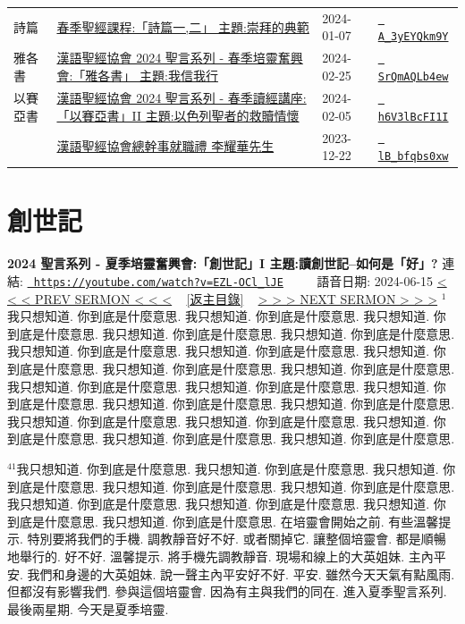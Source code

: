 \documentclass{book}
\begin{document}
{\begin{xltabular}{\textwidth}{|p{0.15\textwidth} p{0.6\textwidth}|p{0.07\textwidth} p{0.1\textwidth}|}
詩篇   & \hyperref[sec:A_3yEYQkm9Y]{春季聖經課程:「詩篇一,二」 主題:崇拜的典範} & 2024-01-07 & \href{https://youtube.com/watch?v=A_3yEYQkm9Y}{\texttt{ A\_3yEYQkm9Y}} \\
雅各書   & \hyperref[sec:SrQmAQLb4ew]{漢語聖經協會 2024 聖言系列 - 春季培靈奮興會:「雅各書」 主題:我信我行} & 2024-02-25 & \href{https://youtube.com/watch?v=SrQmAQLb4ew}{\texttt{ SrQmAQLb4ew}} \\
以賽亞書   & \hyperref[sec:h6V3lBcFI1I]{漢語聖經協會 2024 聖言系列 - 春季讀經講座:「以賽亞書」II 主題:以色列聖者的救贖情懷} & 2024-02-05 & \href{https://youtube.com/watch?v=h6V3lBcFI1I}{\texttt{ h6V3lBcFI1I}} \\
    & \hyperref[sec:lB_bfqbs0xw]{漢語聖經協會總幹事就職禮 李耀華先生} & 2023-12-22 & \href{https://youtube.com/watch?v=lB_bfqbs0xw}{\texttt{ lB\_bfqbs0xw}} \\
\end{xltabular}
}
\newpage



\section{創世記}
\label{sec:EZL_OCl_lJE}
\textbf{2024 聖言系列 - 夏季培靈奮興會:「創世記」I 主題:讀創世記–如何是「好」?}
\newline
\newline
連結: \href{https://youtube.com/watch?v=EZL-OCl_lJE}{\texttt{ https://youtube.com/watch?v=EZL-OCl\_lJE}} ~~~~ 語音日期: 2024-06-15 
\newline
\newline
\hyperref[sec:code]{\small{< < < PREV SERMON < < <}}
~
\hyperref[sec:index]{\small{[返主目錄]}}
~
\hyperref[sec:R54GUORH3eY]{\small{> > > NEXT SERMON > > >}}
\newline
\newline
$^{1}$我只想知道.
你到底是什麼意思.
我只想知道.
你到底是什麼意思.
我只想知道.
你到底是什麼意思.
我只想知道.
你到底是什麼意思.
我只想知道.
你到底是什麼意思.
我只想知道.
你到底是什麼意思.
我只想知道.
你到底是什麼意思.
我只想知道.
你到底是什麼意思.
我只想知道.
你到底是什麼意思.
我只想知道.
你到底是什麼意思.
我只想知道.
你到底是什麼意思.
我只想知道.
你到底是什麼意思.
我只想知道.
你到底是什麼意思.
我只想知道.
你到底是什麼意思.
我只想知道.
你到底是什麼意思.
我只想知道.
你到底是什麼意思.
我只想知道.
你到底是什麼意思.
我只想知道.
你到底是什麼意思.
我只想知道.
你到底是什麼意思.
我只想知道.
你到底是什麼意思.

$^{41}$我只想知道.
你到底是什麼意思.
我只想知道.
你到底是什麼意思.
我只想知道.
你到底是什麼意思.
我只想知道.
你到底是什麼意思.
我只想知道.
你到底是什麼意思.
我只想知道.
你到底是什麼意思.
我只想知道.
你到底是什麼意思.
我只想知道.
你到底是什麼意思.
我只想知道.
你到底是什麼意思.
在培靈會開始之前.
有些溫馨提示.
特別要將我們的手機.
調教靜音好不好.
或者關掉它.
讓整個培靈會.
都是順暢地舉行的.
好不好.
溫馨提示.
將手機先調教靜音.
現場和線上的大英姐妹.
主內平安.
我們和身邊的大英姐妹.
說一聲主內平安好不好.
平安.
雖然今天天氣有點風雨.
但都沒有影響我們.
參與這個培靈會.
因為有主與我們的同在.
進入夏季聖言系列.
最後兩星期.
今天是夏季培靈.
\end{document}
